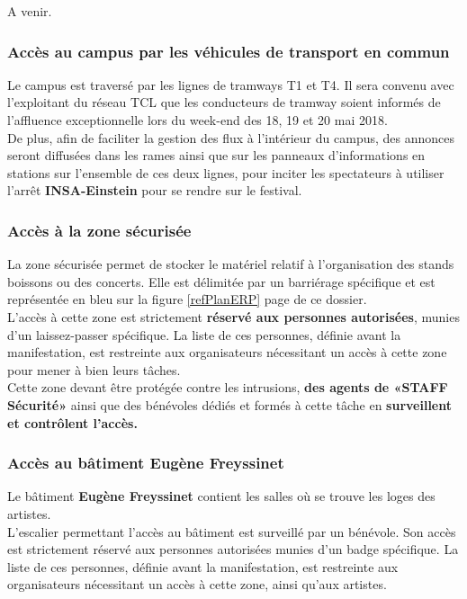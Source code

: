 \documentclass[hidelinks, paper=a4, fontsize=13pt]{report}
\begin{document}
A venir.

\subsubsection{Accès au campus par les véhicules de transport en commun}

Le campus est traversé par les lignes de tramways T1 et T4. Il sera convenu avec l’exploitant du réseau TCL que les conducteurs de tramway soient informés de l’affluence exceptionnelle lors du week-end des 18, 19 et 20 mai 2018.\\

De plus, afin de faciliter la gestion des flux à l’intérieur du campus, des annonces seront diffusées dans les rames ainsi que sur les panneaux d’informations en stations sur l’ensemble de ces deux lignes, pour inciter les spectateurs à utiliser l’arrêt \textbf{INSA-Einstein} pour se rendre sur le festival.\\
\subsubsection{Accès à la zone sécurisée}

La zone sécurisée permet de stocker le matériel relatif à l’organisation des stands boissons ou des concerts. Elle est délimitée par un barriérage spécifique et est représentée en bleu sur la figure \ref{refPlanERP} page \pageref{refPlanERP} de ce dossier.\\

L’accès à cette zone est strictement \textbf{réservé aux personnes autorisées}, munies d’un laissez-passer spécifique. La liste de ces personnes, définie avant la manifestation, est restreinte aux organisateurs nécessitant un accès à cette zone pour mener à bien leurs tâches. \\

Cette zone devant être protégée contre les intrusions, \textbf{des agents de «STAFF Sécurité»} ainsi que des bénévoles dédiés et formés à cette tâche en \textbf{surveillent et contrôlent l’accès.}

\subsubsection{Accès au bâtiment Eugène Freyssinet}
Le bâtiment \textbf{Eugène Freyssinet} contient les salles où se trouve les loges des artistes. \\
L’escalier permettant l’accès au bâtiment est surveillé par un bénévole. Son accès est strictement réservé aux personnes autorisées munies d’un badge spécifique. La liste de ces personnes, définie avant la manifestation, est restreinte aux organisateurs nécessitant un accès à cette zone, ainsi qu'aux artistes.
\end{document}

